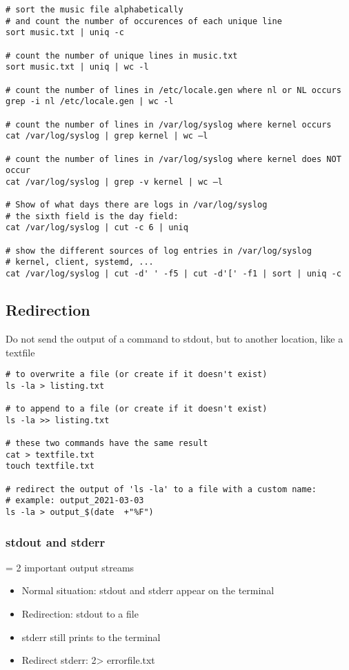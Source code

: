 \documentclass{article}
\begin{document}
\begin{verbatim}
# sort the music file alphabetically
# and count the number of occurences of each unique line
sort music.txt | uniq -c

# count the number of unique lines in music.txt
sort music.txt | uniq | wc -l

# count the number of lines in /etc/locale.gen where nl or NL occurs
grep -i nl /etc/locale.gen | wc -l

# count the number of lines in /var/log/syslog where kernel occurs
cat /var/log/syslog | grep kernel | wc –l

# count the number of lines in /var/log/syslog where kernel does NOT occur
cat /var/log/syslog | grep -v kernel | wc –l

# Show of what days there are logs in /var/log/syslog
# the sixth field is the day field:
cat /var/log/syslog | cut -c 6 | uniq

# show the different sources of log entries in /var/log/syslog
# kernel, client, systemd, ...
cat /var/log/syslog | cut -d' ' -f5 | cut -d'[' -f1 | sort | uniq -c
\end{verbatim}

\subsection{Redirection}

Do not send the output of a command to stdout, but to another location, like a textfile

\begin{verbatim}
# to overwrite a file (or create if it doesn't exist)
ls -la > listing.txt

# to append to a file (or create if it doesn't exist)
ls -la >> listing.txt

# these two commands have the same result
cat > textfile.txt
touch textfile.txt

# redirect the output of 'ls -la' to a file with a custom name:
# example: output_2021-03-03
ls -la > output_$(date  +"%F")
\end{verbatim}

\subsubsection{stdout and stderr}

= 2 important output streams

\begin{itemize}
    \item Normal situation: stdout and stderr appear on the terminal
    \item Redirection: stdout to a file
    \item stderr still prints to the terminal
    \item Redirect stderr: 2> errorfile.txt
\end{itemize}
\end{document}
